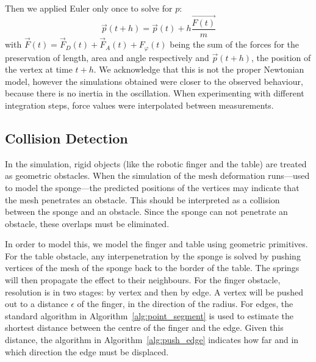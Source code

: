 \documentclass[journal]{IEEEtran}
\newcommand{\alref}[1]{Algorithm~\ref{#1}}
\newcounter{algorithm}
\begin{document}
Then we applied Euler only once to solve for $p$:
\begin{equation}
 \vec{p}(t+h) = \vec{p}(t) + h \dfrac{\vec{F(t)}}{m}\label{eq:integration}
\end{equation}
with $\vec{F}(t) = \vec{F}_D(t) + \vec{F}_A(t) + F_\varphi(t)$ being the sum of the forces for the preservation of length, area and angle respectively and $\vec{p}(t+h)$, the position of the vertex at time $t+h$.  We acknowledge that this is not the proper Newtonian model, however the simulations obtained were closer to the observed behaviour, because there is no inertia in the oscillation.
When experimenting with different integration steps, force values were interpolated between measurements.


\subsection{Collision Detection}
In the simulation, rigid objects (like the robotic finger and the table) are treated as geometric obstacles.  When the simulation of the mesh deformation runs---used to model the sponge---the predicted positions of the vertices may indicate that the mesh penetrates an obstacle.  This should be interpreted as a collision between the sponge and an obstacle.  Since the sponge can not penetrate an obstacle, these overlaps must be eliminated. %

In order to model this, we model the finger and table using geometric primitives.  For the table obstacle, any interpenetration by the sponge is solved by pushing vertices of the mesh of the sponge back to the border of the table.  The springs will then propagate the effect to their neighbours.  For the finger obstacle, resolution is in two stages: by vertex and then by edge.  A vertex will be pushed out to a distance $\epsilon$ of the finger, in the direction of the radius.  For edges, the standard algorithm in \alref{alg:point_segment} is used to estimate the shortest distance between the centre of the finger and the edge.  Given this distance, the algorithm in \alref{alg:push_edge} indicates how far and in which direction the edge must be displaced.
\end{document}
